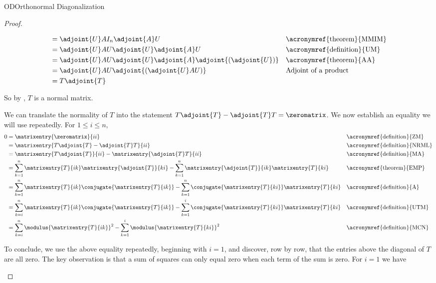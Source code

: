 \begin{subsect}{OD}{Orthonormal Diagonalization}
\begin{proof}
\begin{para}
\begin{align*}
&=\adjoint{U}AI_n\adjoint{A}U&&\text{\acronymref{theorem}{MMIM}}\\
&=\adjoint{U}AU\adjoint{U}\adjoint{A}U&&\text{\acronymref{definition}{UM}}\\
&=\adjoint{U}AU\adjoint{U}\adjoint{A}\adjoint{\left(\adjoint{U}\right)}&&\text{\acronymref{theorem}{AA}}\\
&=\adjoint{U}AU\adjoint{\left(\adjoint{U}AU\right)}&&\text{Adjoint of a product}\\
&=T\adjoint{T}
\end{align*}
\end{para}
%
\begin{para}So by , $T$ is a normal matrix.\end{para}
%
\begin{para}We can translate the normality of $T$ into the statement $T\adjoint{T}-\adjoint{T}T=\zeromatrix$.  We now establish an equality we will use repeatedly.  For $1\leq i\leq n$,
%
\begin{align*}
0
&=\matrixentry{\zeromatrix}{ii}&&\text{\acronymref{definition}{ZM}}\\
&=\matrixentry{T\adjoint{T}-\adjoint{T}T}{ii}&&\text{\acronymref{definition}{NRML}}\\
&=\matrixentry{T\adjoint{T}}{ii}-\matrixentry{\adjoint{T}T}{ii}&&\text{\acronymref{definition}{MA}}\\
&=
 \sum_{k=1}^{n}\matrixentry{T}{ik}\matrixentry{\adjoint{T}}{ki}
-\sum_{k=1}^{n}\matrixentry{\adjoint{T}}{ik}\matrixentry{T}{ki}
&&\text{\acronymref{theorem}{EMP}}\\
&=
 \sum_{k=1}^{n}\matrixentry{T}{ik}\conjugate{\matrixentry{T}{ik}}
-\sum_{k=1}^{n}\conjugate{\matrixentry{T}{ki}}\matrixentry{T}{ki}
&&\text{\acronymref{definition}{A}}\\
&=
 \sum_{k=i}^{n}\matrixentry{T}{ik}\conjugate{\matrixentry{T}{ik}}
-\sum_{k=1}^{i}\conjugate{\matrixentry{T}{ki}}\matrixentry{T}{ki}
&&\text{\acronymref{definition}{UTM}}\\
&=
 \sum_{k=i}^{n}\modulus{\matrixentry{T}{ik}}^2
-\sum_{k=1}^{i}\modulus{\matrixentry{T}{ki}}^2
&&\text{\acronymref{definition}{MCN}}
\end{align*}
\end{para}
%
\begin{para}To conclude, we use the above equality repeatedly, beginning with $i=1$, and discover, row by row, that the entries above the diagonal of $T$ are all zero.  The key observation is that a sum of squares can only equal zero when each term of the sum is zero.  For $i=1$ we have

\end{para}
\end{proof}
\end{subsect}
